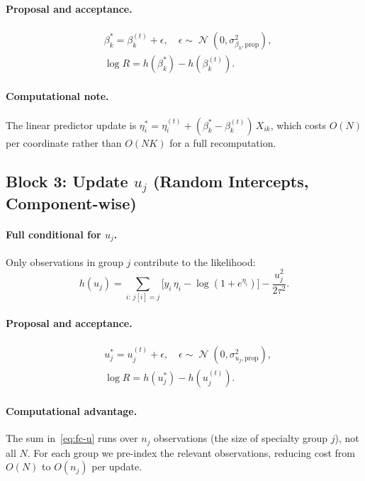 \documentclass[11pt]{article}
\DeclareMathOperator{\Normal}{\mathcal{N}}
\begin{document}
\paragraph{Proposal and acceptance.}
\begin{align}
  &\beta_k^* = \beta_k^{(t)} + \epsilon, \quad \epsilon \sim \Normal(0,\sigma_{\beta_k,\text{prop}}^2), \label{eq:prop-beta}\\
  &\log R = h(\beta_k^*) - h(\beta_k^{(t)}). \label{eq:ar-beta}
\end{align}

\paragraph{Computational note.}
The linear predictor update is
$\eta_i^* = \eta_i^{(t)} + (\beta_k^* - \beta_k^{(t)})\,X_{ik}$,
which costs $O(N)$ per coordinate rather than $O(NK)$ for a full
recomputation.

\subsection{Block 3: Update $u_j$ (Random Intercepts, Component-wise)}
\label{sec:block-u}

\paragraph{Full conditional for $u_j$.}
Only observations in group $j$ contribute to the likelihood:
\begin{equation}\label{eq:fc-u}
  h(u_j) = \sum_{i:\,j[i]=j}
    \bigl[y_i\,\eta_i - \log(1+e^{\eta_i})\bigr]
  - \frac{u_j^2}{2\tau^2}.
\end{equation}

\paragraph{Proposal and acceptance.}
\begin{align}
  &u_j^* = u_j^{(t)} + \epsilon, \quad \epsilon \sim \Normal(0,\sigma_{u_j,\text{prop}}^2), \label{eq:prop-u}\\
  &\log R = h(u_j^*) - h(u_j^{(t)}). \label{eq:ar-u}
\end{align}

\paragraph{Computational advantage.}
The sum in~\eqref{eq:fc-u} runs over $n_j$ observations (the size of
specialty group $j$), not all $N$. For each group we pre-index the
relevant observations, reducing cost from $O(N)$ to $O(n_j)$ per update.
\end{document}

